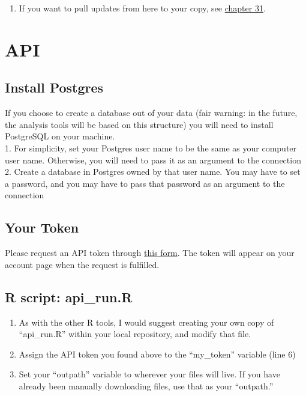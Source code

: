 \documentclass[
]{book}
\providecommand{\tightlist}{%
  \setlength{\itemsep}{0pt}\setlength{\parskip}{0pt}}
\begin{document}
\begin{enumerate}
\def\labelenumi{\arabic{enumi}.}
\setcounter{enumi}{3}
\tightlist
\item
  If you want to pull updates from here to your copy, see \href{https://happygitwithr.com/upstream-changes.html\#pull-changes-from-upstream}{chapter 31}.
\end{enumerate}

\hypertarget{intro}{%
\chapter{API}\label{intro}}

\hypertarget{install-postgres}{%
\section{Install Postgres}\label{install-postgres}}

If you choose to create a database out of your data (fair warning: in the future, the analysis tools will be based on this structure) you will need to install PostgreSQL on your machine.\\
1. For simplicity, set your Postgres user name to be the same as your computer user name. Otherwise, you will need to pass it as an argument to the connection\\
2. Create a database in Postgres owned by that user name. You may have to set a password, and you may have to pass that password as an argument to the connection

\hypertarget{your-token}{%
\section{Your Token}\label{your-token}}

Please request an API token through \href{https://celltracktech.com/support-radio-api/}{this form}. The token will appear on your account page when the request is fulfilled.

\hypertarget{r-script-api_run.r}{%
\section{R script: api\_run.R}\label{r-script-api_run.r}}

\begin{enumerate}
\def\labelenumi{\arabic{enumi}.}
\tightlist
\item
  As with the other R tools, I would suggest creating your own copy of ``api\_run.R'' within your local repository, and modify that file.
\item
  Assign the API token you found above to the ``my\_token'' variable (line 6)\\
\item
  Set your ``outpath'' variable to wherever your files will live. If you have already been manually downloading files, use that as your ``outpath.''
\end{enumerate}
\end{document}
